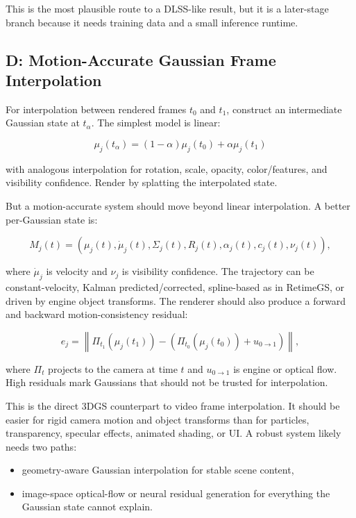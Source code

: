 \documentclass[11pt]{article}
\begin{document}
This is the most plausible route to a DLSS-like result, but it is a later-stage
branch because it needs training data and a small inference runtime.

\subsection{D: Motion-Accurate Gaussian Frame Interpolation}

For interpolation between rendered frames $t_0$ and $t_1$, construct an
intermediate Gaussian state at $t_\alpha$. The simplest model is linear:

\[
  \mu_j(t_\alpha) =
  (1-\alpha)\mu_j(t_0) + \alpha \mu_j(t_1)
\]

with analogous interpolation for rotation, scale, opacity, color/features, and
visibility confidence. Render by splatting the interpolated state.

But a motion-accurate system should move beyond linear interpolation. A better
per-Gaussian state is:

\[
  M_j(t) = (\mu_j(t), \dot{\mu}_j(t), \Sigma_j(t), R_j(t),
            \alpha_j(t), c_j(t), \nu_j(t)),
\]

where $\dot{\mu}_j$ is velocity and $\nu_j$ is visibility confidence. The
trajectory can be constant-velocity, Kalman predicted/corrected, spline-based
as in RetimeGS, or driven by engine object transforms. The renderer should also
produce a forward and backward motion-consistency residual:

\[
  e_j =
  \left\|\Pi_{t_1}(\mu_j(t_1)) -
  \left(\Pi_{t_0}(\mu_j(t_0)) + u_{0\rightarrow1}\right)\right\|,
\]

where $\Pi_t$ projects to the camera at time $t$ and $u_{0\rightarrow1}$ is
engine or optical flow. High residuals mark Gaussians that should not be
trusted for interpolation.

This is the direct 3DGS counterpart to video frame interpolation. It should be
easier for rigid camera motion and object transforms than for particles,
transparency, specular effects, animated shading, or UI. A robust system likely
needs two paths:

\begin{itemize}
  \item geometry-aware Gaussian interpolation for stable scene content,
  \item image-space optical-flow or neural residual generation for everything
        the Gaussian state cannot explain.
\end{itemize}
\end{document}
